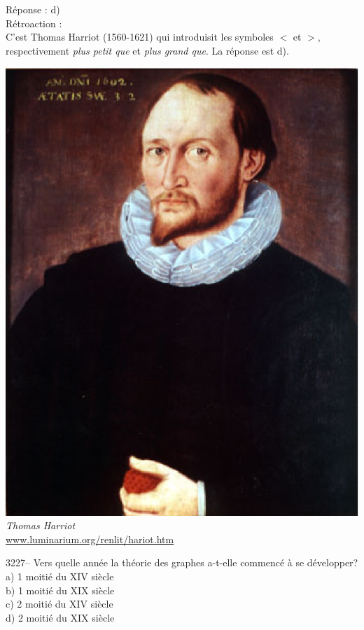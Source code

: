 \documentclass[letterpaper, 12pt]{article}
\begin{document}
R\'eponse : d)\\

R\'etroaction :\\
C'est Thomas Harriot (1560-1621) qui introduisit les symboles $<$ et $>$, respectivement \emph{plus petit que} et \emph{plus grand que}. La r\'eponse est d).
\begin{center}
\includegraphics[scale=0.25]{harriot.eps}\\
\emph{{\small Thomas Harriot}}\\
\href{http://www.luminarium.org/renlit/hariot.htm}{www.luminarium.org/renlit/hariot.htm}\\[5mm]
\end{center}



3227-- Vers quelle ann\'ee la th\'eorie des graphes a-t-elle commenc\'e \`a se d\'evelopper?\\

a) 1\iere{} moiti\'e du {\scriptsize XIV\ieme{}} si\`ecle\\
b) 1\iere{} moiti\'e du {\scriptsize XIX\ieme{}} si\`ecle\\
c) 2\ieme{} moiti\'e du {\scriptsize XIV\ieme{}} si\`ecle\\
d) 2\ieme{} moiti\'e du {\scriptsize XIX\ieme{}} si\`ecle\\
\end{document}
